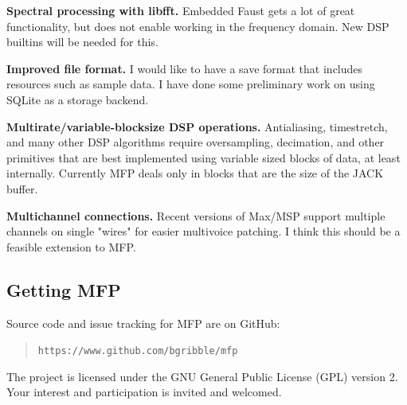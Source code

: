 \documentclass[a4paper]{article}
\begin{document}
{\bf Spectral processing with libfft.} Embedded Faust gets a lot
of great functionality, but does not enable working in the
frequency domain. New DSP builtins will be needed for this.

{\bf Improved file format.} I would like to have a save format
that includes resources such as sample data. I have done some
preliminary work on using SQLite as a storage backend.

{\bf Multirate/variable-blocksize DSP operations.} Antialiasing,
timestretch, and many other DSP algorithms require oversampling,
decimation, and other primitives that are best implemented using
variable sized blocks of data, at least internally. Currently MFP
deals only in blocks that are the size of the JACK buffer.

{\bf Multichannel connections.} Recent versions of Max/MSP
support multiple channels on single "wires" for easier multivoice
patching. I think this should be a feasible extension to MFP.


\subsection{Getting MFP}

Source code and issue tracking for MFP are on GitHub:

\begin{quote}
\texttt{https://www.github.com/bgribble/mfp}
\end{quote}

The project is licensed under the GNU General Public License (GPL) version
2. Your interest and participation is invited and welcomed.

\nocite{*}


\end{document}
